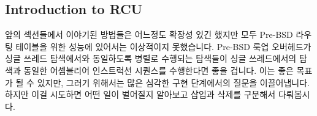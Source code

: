 
\subsection{Introduction to RCU}
\label{sec:defer:Introduction to RCU}

앞의 섹션들에서 이야기된 방법들은 어느정도 확장성 있긴 했지만 모두 Pre-BSD
라우팅 테이블을 위한 성능에 있어서는 이상적이지 못했습니다.
Pre-BSD 룩업 오버헤드가 싱글 쓰레드 탐색에서와 동일하도록 병렬로 수행되는
탐색들이 싱글 쓰레드에서의 탐색과 동일한 어셈블리어 인스트럭션 시퀀스를
수행한다면 좋을 겁니다.
이는 좋은 목표가 될 수 있지만, 그러기 위해서는 많은 심각한 구현 단계에서의
질문을 이끌어냅니다.
하지만 이걸 시도하면 어떤 일이 벌어질지 알아보고 삽입과 삭제를 구분해서
다뤄봅시다.

